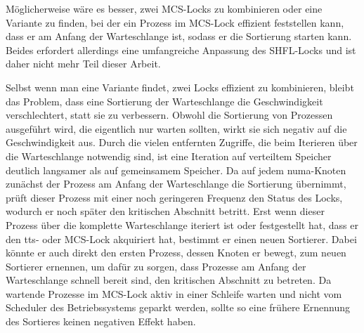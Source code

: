 Möglicherweise wäre es besser,
zwei MCS-Locks zu kombinieren
oder eine Variante zu finden,
bei der ein Prozess im MCS-Lock effizient feststellen kann,
dass er am Anfang der Warteschlange ist,
sodass er die Sortierung starten kann.
Beides erfordert allerdings eine umfangreiche Anpassung des SHFL-Locks
und ist daher nicht mehr Teil dieser Arbeit.

Selbst wenn man eine Variante findet,
zwei Locks effizient zu kombinieren,
bleibt das Problem,
dass eine Sortierung der Warteschlange die Geschwindigkeit verschlechtert,
statt sie zu verbessern.
Obwohl die Sortierung von Prozessen ausgeführt wird,
die eigentlich nur warten sollten,
wirkt sie sich negativ auf die Geschwindigkeit aus.
Durch die vielen entfernten Zugriffe,
die beim Iterieren über die Warteschlange notwendig sind,
ist eine Iteration auf verteiltem Speicher deutlich langsamer
als auf gemeinsamem Speicher.
Da auf jedem \gls{numa}-Knoten zunächst der Prozess
am Anfang der Warteschlange die Sortierung übernimmt,
prüft dieser Prozess mit einer noch geringeren Frequenz den Status des Locks,
wodurch er noch später den kritischen Abschnitt betritt.
Erst wenn dieser Prozess über die komplette Warteschlange iteriert ist
oder festgestellt hat,
dass er den \gls{tts}- oder MCS-Lock akquiriert hat,
bestimmt er einen neuen Sortierer.
Dabei könnte er auch direkt den ersten Prozess,
dessen Knoten er bewegt,
zum neuen Sortierer ernennen,
um dafür zu sorgen,
dass Prozesse am Anfang der Warteschlange schnell bereit sind,
den kritischen Abschnitt zu betreten.
Da wartende Prozesse im MCS-Lock aktiv in einer Schleife warten
und nicht vom Scheduler des Betriebssystems geparkt werden,
sollte so eine frühere Ernennung des Sortieres keinen negativen Effekt haben.

